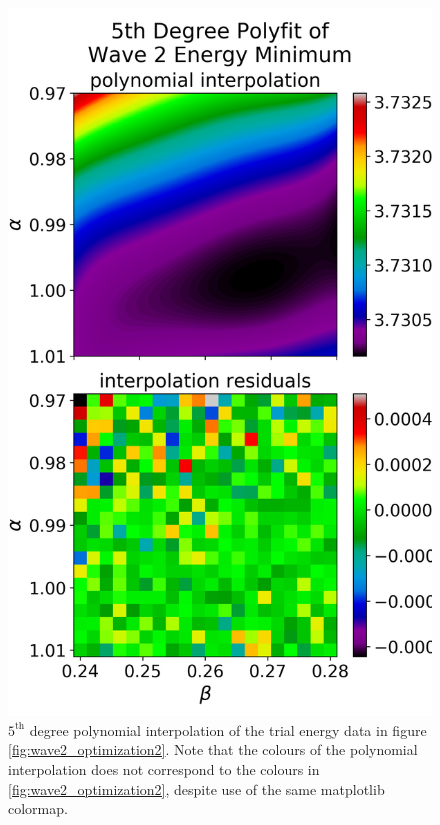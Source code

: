 \documentclass[nofootinbib,reprint,english]{revtex4-1}
\begin{document}
\begin{figure}
\centering
\includegraphics[scale=0.6]{../results/wave2/energy_minimization_deg5polyfit_5.png}
\caption{\(5^\text{th}\) degree polynomial interpolation of the trial energy data in figure \ref{fig:wave2_optimization2}. Note that the colours of the polynomial interpolation does not correspond to the colours in \ref{fig:wave2_optimization2}, despite use of the same matplotlib colormap.}\label{fig:wave2_polyfit}
\end{figure}
\end{document}
